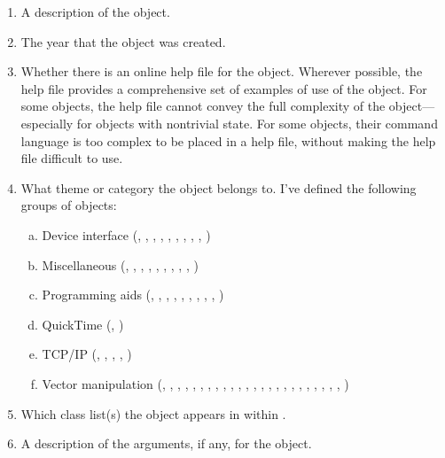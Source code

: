 \begin{enumerate}[  1)]
\item A description of the object.
\item The year that the object was created.
\item Whether there is an online help file for the object.
Wherever possible, the help file provides a comprehensive set of examples of use of the object.
For some objects, the help file cannot convey the full complexity of the object---especially for objects with nontrivial state.
For some objects, their command language is too complex to be placed in a help file, without making the help file difficult to use.
\item What theme or category the object belongs to.
I've defined the following groups of objects:
  \begin{enumerate}[a)]
  \item Device interface (, , , , , ,
    , , , )
  \item Miscellaneous (, , , , ,
    , , , , )
  \item Programming aids (, , , , ,
    , , , , )
  \item QuickTime\texttrademark{} (, )
  \item TCP/IP (, , , , )
  \item Vector manipulation (, , , , ,
    , , , , , , ,
    , , , , , ,
    , , , , , , )
  \end{enumerate}
\item Which class list(s) the object appears in within \MaxName.
\item A description of the arguments, if any, for the object.

\end{enumerate}
